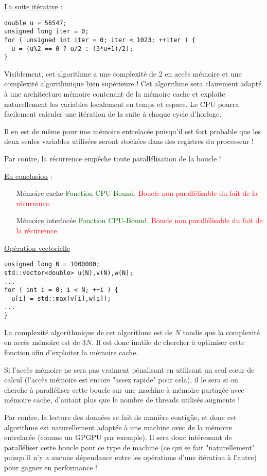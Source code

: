 \documentclass[fleqn,11pt]{article}
\begin{document}
\underline{La suite itérative} :

\begin{lstlisting}
double u = 56547;
unsigned long iter = 0;
for ( unsigned int iter = 0; iter < 1023; ++iter ) {
  u = (u%2 == 0 ? u/2 : (3*u+1)/2);
}
\end{lstlisting}

Visiblement, cet algorithme a une complexité de 2 en accès mémoire et une complexité algorithmique bien supérieure ! Cet algorithme sera clairement adapté à une architecture mémoire contenant de la mémoire cache
et exploite naturellement les variables  localement en temps et espace. Le CPU pourra facilement calculer une itération de la suite à chaque cycle d'horloge. 

Il en est de même pour une mémoire entrelacée puisqu'il est fort probable que les deux seules variables utilisées seront stockées dans des registres du processeur !

Par contre, la récurrence empêche toute parallélisation de la boucle !

\underline{En conclusion} :
\begin{itemize}
\item [Mémoire cache] \textcolor{darkgreen}{Fonction CPU-Bound}. \textcolor{red}{Boucle non parallélisable du fait de la récurrence}.
\item [Mémoire interlacée] \textcolor{darkgreen}{Fonction CPU-Bound}. \textcolor{red}{Boucle non parallélisable du fait de la récurrence}.
\end{itemize}

\underline{Opération vectorielle}

\begin{lstlisting}
unsigned long N = 1000000;
std::vector<double> u(N),v(N),w(N);
...
for ( int i = 0; i < N; ++i ) {
  u[i] = std::max(v[i],w[i]);
...
}
\end{lstlisting}

La complexité algorithmique de cet algorithme est de $N$ tandis que la complexité en accès mémoire
est de $3N$. Il est donc inutile de chercher à optimiser cette fonction afin d'exploiter la mémoire cache.

Si l'accès mémoire ne sera pas vraiment pénalisant en utilisant un seul c{\oe}ur de calcul (l'accès mémoire est encore "assez rapide" pour cela), il le sera si on cherche à paralléliser cette boucle sur une machine à mémoire partagée avec mémoire cache, d'autant plus que le nombre de threads utilisés augmente !

Par contre, la lecture des données se fait de manière contigüe, et donc cet algorithme est naturellement
adaptée à une machine avec de la mémoire entrelacée (comme un GPGPU par exemple). Il sera donc intéressant
de paralléliser cette boucle pour ce type de machine (ce qui se fait "naturellement" puisqu'il n'y a aucune
dépendance entre les opérations d'une itération à l'autre) pour gagner en performance !
\end{document}
